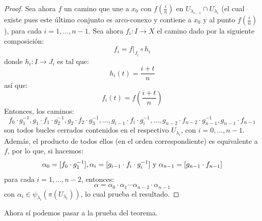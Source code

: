 \documentclass[12pt]{report}
\theoremstyle{largebreak}
\newcommand\cf[3]{\ensuremath{#1:#2\rightarrow#3}}
\begin{document}
\begin{proof}
        Sea ahora $f$ un camino que une a $x_0$ con $f\left(\frac{i}{n}\right)$ en $U_{\lambda_{ i-1}}\cap U_{\lambda_i}$ (el cual existe pues este último conjunto es arco-conexo y contiene a $x_0$ y al punto $f\left(\frac{i}{n}\right)$), para cada $i=1,...,n-1$. Sea ahora $\cf{f_i}{I}{X}$ el camino dado por la siguiente composición:
        \begin{equation*}
            f_i=f\big|_{J_i}\circ h_i
        \end{equation*}
        donde $\cf{h_i}{I}{J_i}$ es tal que:
        \begin{equation*}
            h_i(t)=\frac{i+t}{n}
        \end{equation*}
        así que:
        \begin{equation*}
            f_i(t)=f\left(\frac{i+t}{n}\right)
        \end{equation*}
        Entonces, los caminos:
        \begin{equation*}
            f_0\cdot g_1^{-1},g_1\cdot f_1\cdot g_2^{-1},g_2\cdot f_2\cdot g_3^{-1},...,g_{i-1}\cdot f_{i}\cdot g_{i}^{-1},...,g_{ n-2}\cdot f_{ n-2}\cdot g_{ n-1}^{-1}, g_{ n-1}\cdot f_{ n-1}
        \end{equation*}
        son todos bucles cerrados contenidos en el respectivo $U_{\lambda_i}$, con $i=0,...,n-1$. Además, el producto de todos ellos (en el orden correspondiente) es equivalente a $f$, por lo que, si hacemos:
        \begin{equation*}
            \alpha_0=[f_0\cdot g_1^{-1}],\alpha_i=[g_{i-1}\cdot f_{i}\cdot g_{i}^{-1}]\textup{ y }\alpha_{ n-1}=[g_{ n-1}\cdot f_{ n-1}]
        \end{equation*}
        para cada $i=1,...,n-2$, entonces:
        \begin{equation*}
            \alpha=\alpha_0\cdot\alpha_1\cdots\alpha_{ n-2}\cdot\alpha_{ n-1}
        \end{equation*}
        con $\alpha_i\in\psi_{\lambda_i}\left(\pi(U_{\lambda_i})\right)$, lo cual prueba el resultado.
    \end{proof}

    Ahora sí podemos pasar a la prueba del teorema.
\end{document}
